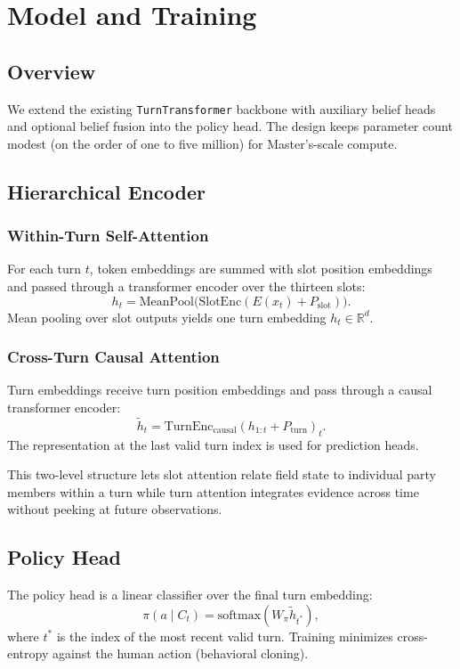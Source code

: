 \chapter{Model and Training}
\label{ch:model}

\section{Overview}

We extend the existing \texttt{TurnTransformer} backbone with auxiliary belief
heads and optional belief fusion into the policy head. The design keeps
parameter count modest (on the order of one to five million) for Master's-scale
compute.

\section{Hierarchical Encoder}

\subsection{Within-Turn Self-Attention}

For each turn $t$, token embeddings are summed with slot position embeddings and
passed through a transformer encoder over the thirteen slots:
\[
  h_t = \mathrm{MeanPool}\bigl(\mathrm{SlotEnc}(E(x_t) + P_\mathrm{slot})\bigr).
\]
Mean pooling over slot outputs yields one turn embedding $h_t \in \mathbb{R}^d$.

\subsection{Cross-Turn Causal Attention}

Turn embeddings receive turn position embeddings and pass through a causal
transformer encoder:
\[
  \tilde{h}_t = \mathrm{TurnEnc}_\mathrm{causal}(h_{1:t} + P_\mathrm{turn})_t.
\]
The representation at the last valid turn index is used for prediction heads.

This two-level structure lets slot attention relate field state to individual
party members within a turn while turn attention integrates evidence across
time without peeking at future observations.

\section{Policy Head}

The policy head is a linear classifier over the final turn embedding:
\[
  \pi(a \mid C_t) = \mathrm{softmax}(W_\pi \tilde{h}_{t^*}),
\]
where $t^*$ is the index of the most recent valid turn. Training minimizes
cross-entropy against the human action (behavioral cloning).


